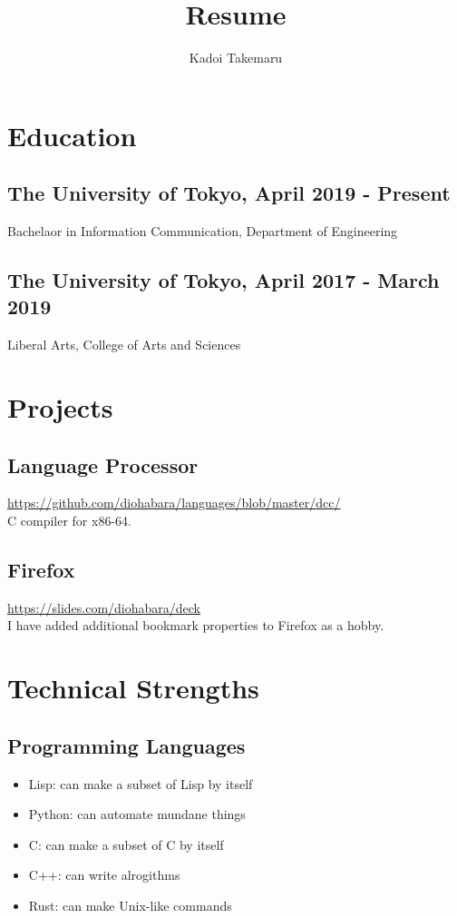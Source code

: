 \documentclass{article}
\title{Resume}
\author{Kadoi Takemaru}
\begin{document}
\maketitle

\section*{Education}
    \subsection*{The University of Tokyo, April 2019 - Present}
        Bachelaor in Information Communication, Department of Engineering
    \subsection*{The University of Tokyo, April 2017 - March 2019}
        Liberal Arts, College of Arts and Sciences

\section*{Projects}
    \subsection*{Language Processor}
        \url{https://github.com/diohabara/languages/blob/master/dcc/}
        \\ C compiler for x86-64.

    \subsection*{Firefox}
        \url{https://slides.com/diohabara/deck}
        \\ I have added additional bookmark properties to Firefox as a hobby.

\section*{Technical Strengths}
    \subsection*{Programming Languages}
        \begin{itemize}
            \item Lisp: can make a subset of Lisp by itself
            \item Python: can automate mundane things
            \item C: can make a subset of C by itself
            \item C++: can write alrogithms
            \item Rust: can make Unix-like commands
        \end{itemize}
\end{document}
